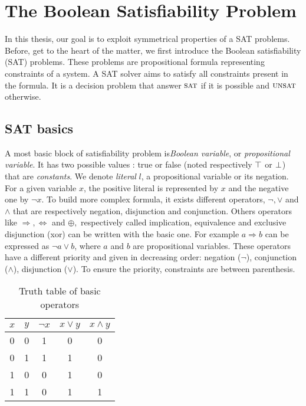 \chapter{The Boolean Satisfiability Problem}\label{chap:preliminaries}
\minitoc

In this thesis, our goal is to exploit symmetrical properties of a SAT problems.
Before, get to the heart of the matter, we first introduce the Boolean satisfiability (SAT)  problems.
These problems are propositional formula  representing constraints of a system.
A SAT solver aims to satisfy all constraints present in the formula.
It is a decision problem that answer $\textsc{sat}$ if it is possible and $\textsc{unsat}$ otherwise.

\section{SAT basics}

A most basic block of satisfiability problem is\emph{Boolean variable}, or \emph{propositional variable}.
It has two possible values : true or false (noted respectively $\top$ or $\bot$) that are \emph{constants}.
We denote \emph{literal} $l$, a propositional variable or its negation.
For a given variable $x$, the positive literal is represented by $x$ and the negative one by $\neg x$.
To build more complex formula, it exists different operators, $\neg, \lor$ and $\land$ that are respectively negation, disjunction and conjunction. Others operators like $\Rightarrow, \Leftrightarrow$ and
$\oplus,$ respectively called implication, equivalence and exclusive disjunction (xor) can be written with the basic one.
For example $a \Rightarrow b$ can be expressed as $ \neg a \lor b$, where $a$ and $b$ are propositional variables.
These operators have a different priority and given in decreasing order:
negation ($\neg$), conjunction ($\land$), disjunction ($\lor$). To ensure
the priority, constraints are between parenthesis.


\begin{table}[!htbp]
	\centering
	\begin{tabular}{cc|ccc}
		$x$ & $y$ & $\neg x$ & $x \lor y$ & $x \land y$ \\
		\toprule
		0 & 0 & 1 & 0 & 0 \\
		\midrule
		0 & 1 & 1 & 1 & 0 \\
		\midrule
		1 & 0 & 0 & 1 & 0 \\
		\midrule
		1 & 1 & 0 & 1 & 1 \\
		\bottomrule
	\end{tabular}
	\caption{Truth table of basic operators}
	\label{tab:truthtable}
\end{table}

